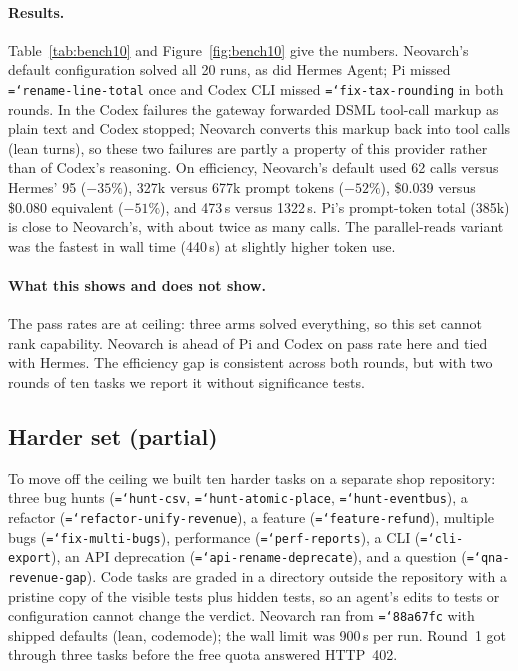 \documentclass[11pt]{article}
\newcommand{\code}[1]{\texttt{\hyphenchar\font=`\-\relax #1}}
\begin{document}
\paragraph{Results.} Table~\ref{tab:bench10} and Figure~\ref{fig:bench10} give the numbers. Neovarch's default configuration solved all 20 runs, as did Hermes Agent; Pi missed
\code{rename-line-total} once and Codex CLI missed \code{fix-tax-rounding} in both rounds. In the Codex failures the gateway forwarded DSML tool-call markup as plain text and Codex stopped;
Neovarch converts this markup back into tool calls (lean turns), so these two failures are partly a property of this provider rather than of Codex's reasoning. On efficiency, Neovarch's default used
62 calls versus Hermes' 95 ($-35\%$), 327k versus 677k prompt tokens ($-52\%$), \$0.039 versus \$0.080 equivalent ($-51\%$), and 473\,s versus 1322\,s. Pi's prompt-token total (385k) is close to
Neovarch's, with about twice as many calls. The parallel-reads variant was the fastest in wall time (440\,s) at slightly higher token use.

\paragraph{What this shows and does not show.} The pass rates are at ceiling: three arms solved everything, so this set cannot rank capability. Neovarch is ahead of Pi and Codex on pass rate here
and tied with Hermes. The efficiency gap is consistent across both rounds, but with two rounds of ten tasks we report it without significance tests.

\subsection{Harder set (partial)}

To move off the ceiling we built ten harder tasks on a separate shop repository: three bug hunts (\code{hunt-csv}, \code{hunt-atomic-place}, \code{hunt-eventbus}), a refactor
(\code{refactor-unify-revenue}), a feature (\code{feature-refund}), multiple bugs (\code{fix-multi-bugs}), performance (\code{perf-reports}), a CLI (\code{cli-export}), an API deprecation
(\code{api-rename-deprecate}), and a question (\code{qna-revenue-gap}). Code tasks are graded in a directory outside the repository with a pristine copy of the visible tests plus hidden tests, so an agent's edits to tests or
configuration cannot change the verdict. Neovarch ran from \code{88a67fc} with shipped defaults (lean, codemode); the wall limit was 900\,s per run. Round~1 got through three tasks before the free quota answered HTTP~402.
\end{document}
